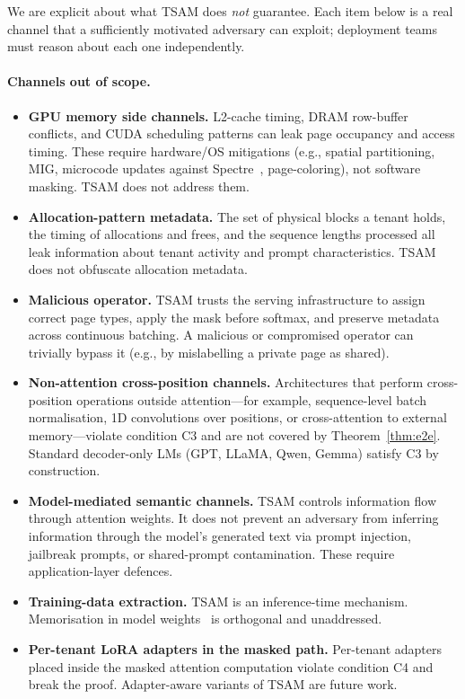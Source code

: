 \documentclass[11pt]{article}
\begin{document}
We are explicit about what TSAM does \emph{not} guarantee.  Each item below
is a real channel that a sufficiently motivated adversary can exploit;
deployment teams must reason about each one independently.

\paragraph{Channels out of scope.}
\begin{itemize}[leftmargin=1.5em,itemsep=2pt]
\item \textbf{GPU memory side channels.}  L2-cache timing, DRAM
  row-buffer conflicts, and CUDA scheduling patterns can leak page
  occupancy and access timing.  These require hardware/OS mitigations
  (e.g., spatial partitioning, MIG, microcode updates against
  Spectre~\citep{kocher2019spectre}, page-coloring), not software
  masking.  TSAM does not address them.
\item \textbf{Allocation-pattern metadata.}  The set of physical blocks a
  tenant holds, the timing of allocations and frees, and the sequence
  lengths processed all leak information about tenant activity and
  prompt characteristics.  TSAM does not obfuscate allocation metadata.
\item \textbf{Malicious operator.}  TSAM trusts the serving infrastructure
  to assign correct page types, apply the mask before softmax, and
  preserve metadata across continuous batching.  A malicious or
  compromised operator can trivially bypass it (e.g., by mislabelling
  a private page as shared).
\item \textbf{Non-attention cross-position channels.}  Architectures that
  perform cross-position operations outside attention---for example,
  sequence-level batch normalisation, 1D convolutions over positions, or
  cross-attention to external memory---violate condition C3 and are not
  covered by Theorem~\ref{thm:e2e}.  Standard decoder-only LMs (GPT,
  LLaMA, Qwen, Gemma) satisfy C3 by construction.
\item \textbf{Model-mediated semantic channels.}  TSAM controls
  information flow through attention weights.  It does not prevent an
  adversary from inferring information through the model's generated
  text via prompt injection, jailbreak prompts, or shared-prompt
  contamination.  These require application-layer defences.
\item \textbf{Training-data extraction.}  TSAM is an inference-time
  mechanism.  Memorisation in model weights~\citep{carlini2021extracting,
  nasr2023scalable, lukas2023analyzing} is orthogonal and unaddressed.
\item \textbf{Per-tenant LoRA adapters in the masked path.}  Per-tenant
  adapters~\citep{hu2022lora, sheng2023slora} placed inside the masked
  attention computation violate condition C4 and break the proof.
  Adapter-aware variants of TSAM are future work.
\end{itemize}
\end{document}
